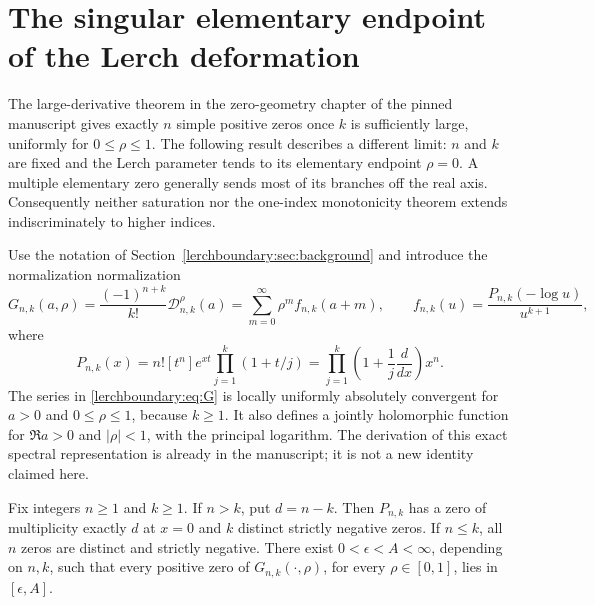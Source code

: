 
\section{The singular elementary endpoint of the Lerch deformation}
\label{lerchboundary:sec:zero}

The large-derivative theorem in the zero-geometry chapter of the pinned manuscript
gives exactly $n$ simple positive zeros once $k$ is sufficiently large,
uniformly for $0\leq\rho\leq1$.  The following result describes a different
limit: $n$ and $k$ are fixed and the Lerch parameter tends to its elementary
endpoint $\rho=0$.  A multiple elementary zero generally sends most of its
branches off the real axis.  Consequently neither saturation nor the
one-index monotonicity theorem extends indiscriminately to higher indices.

Use the notation of Section~\ref{lerchboundary:sec:background} and introduce the
normalization
normalization
\begin{equation}\label{lerchboundary:eq:G}
 G_{n,k}(a,\rho)=\frac{(-1)^{n+k}}{k!}\mathcal D_{n,k}^{\rho}(a)
 =\sum_{m=0}^{\infty}\rho^m f_{n,k}(a+m),\qquad
 f_{n,k}(u)=\frac{P_{n,k}(-\log u)}{u^{k+1}},
\end{equation}
where
\begin{equation}\label{lerchboundary:eq:P}
 P_{n,k}(x)=n![t^n]e^{xt}\prod_{j=1}^k(1+t/j)
 =\prod_{j=1}^k\left(1+\frac1j\frac{d}{dx}\right)x^n.
\end{equation}
The series in \eqref{lerchboundary:eq:G} is locally uniformly absolutely
convergent for $a>0$ and $0\leq\rho\leq1$, because $k\geq1$.
It also defines a jointly holomorphic function for $\Re a>0$ and
$|\rho|<1$, with the principal logarithm. The derivation of this exact
spectral representation is already in the manuscript; it is not a new
identity claimed here.

\begin{lemma}
\label{lerchboundary:lem:roots}
Fix integers $n\geq1$ and $k\geq1$.
If $n>k$, put $d=n-k$. Then $P_{n,k}$ has a zero of multiplicity exactly
$d$ at $x=0$ and $k$ distinct strictly negative zeros. If $n\leq k$, all
$n$ zeros are distinct and strictly negative.
There exist $0<\epsilon<A<\infty$, depending on $n,k$, such that every
positive zero of $G_{n,k}(\cdot,\rho)$, for every $\rho\in[0,1]$, lies
in $[\epsilon,A]$.
\end{lemma}

